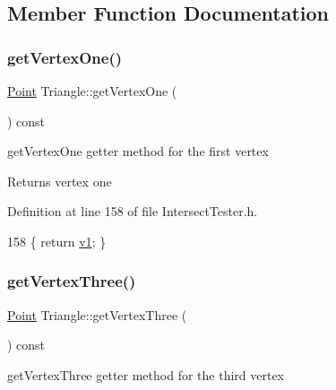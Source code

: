 \subsection{Member Function Documentation}
\mbox{\label{class_triangle_a88a35d0b66c9636a9be88adc88d003aa}} 
\subsubsection{\texorpdfstring{get\+Vertex\+One()}{getVertexOne()}}
{\footnotesize\ttfamily \hyperlink{class_point}{Point} Triangle\+::get\+Vertex\+One (\begin{DoxyParamCaption}{ }\end{DoxyParamCaption}) const\hspace{0.3cm}{\ttfamily [inline]}}



get\+Vertex\+One getter method for the first vertex 

\begin{DoxyReturn}{Returns}
vertex one 
\end{DoxyReturn}


Definition at line 158 of file Intersect\+Tester.\+h.


\begin{DoxyCode}
158 \{ \textcolor{keywordflow}{return} \hyperlink{class_triangle_a64531c5c908b4ba8aca8b619b97a17bc}{v1}; \} 
\end{DoxyCode}
\mbox{\label{class_triangle_aed6ceca804b35da95d3d3c930de41e91}} 
\subsubsection{\texorpdfstring{get\+Vertex\+Three()}{getVertexThree()}}
{\footnotesize\ttfamily \hyperlink{class_point}{Point} Triangle\+::get\+Vertex\+Three (\begin{DoxyParamCaption}{ }\end{DoxyParamCaption}) const\hspace{0.3cm}{\ttfamily [inline]}}



get\+Vertex\+Three getter method for the third vertex 

